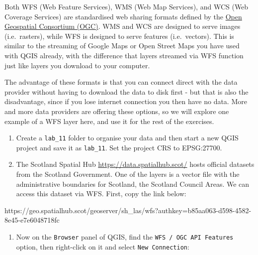 \documentclass[
  letterpaper,
  DIV=11,
  numbers=noendperiod]{scrreprt}
\providecommand{\tightlist}{%
  \setlength{\itemsep}{0pt}\setlength{\parskip}{0pt}}\usepackage{longtable,booktabs,array}
\begin{document}
Both WFS (Web Feature Services), WMS (Web Map Services), and WCS (Web
Coverage Services) are standardised web sharing formats defined by the
\href{https://www.ogc.org/}{Open Geospatial Consortium (OGC)}. WMS and
WCS are designed to serve images (i.e.~rasters), while WFS is designed
to serve features (i.e.~vectors). This is similar to the streaming of
Google Maps or Open Street Maps you have used with QGIS already, with
the difference that layers streamed via WFS function just like layers
you download to your computer.

The advantage of these formats is that you can connect direct with the
data provider without having to download the data to disk first - but
that is also the disadvantage, since if you lose internet connection you
then have no data. More and more data providers are offering these
options, so we will explore one example of a WFS layer here, and use it
for the rest of the exercises.

\begin{enumerate}
\def\labelenumi{(\arabic{enumi})}
\setcounter{enumi}{300}
\item
  Create a \texttt{lab\_11} folder to organise your data and then start
  a new QGIS project and save it as \texttt{lab\_11}. Set the project
  CRS to EPSG:27700.
\item
  The Scotland Spatial Hub \url{https://data.spatialhub.scot/} hosts
  official datasets from the Scotland Government. One of the layers is a
  vector file with the administrative boundaries for Scotland, the
  Scotland Council Areas. We can access this dataset via WFS. First,
  copy the link below:
\end{enumerate}

https://geo.spatialhub.scot/geoserver/sh\_las/wfs?authkey=b85aa063-d598-4582-8e45-e7e6048718fc

\begin{enumerate}
\def\labelenumi{(\arabic{enumi})}
\setcounter{enumi}{302}
\tightlist
\item
  Now on the \texttt{Browser} panel of QGIS, find the
  \texttt{WFS\ /\ OGC\ API\ Features} option, then right-click on it and
  select \texttt{New\ Connection}:
\end{enumerate}
\end{document}
